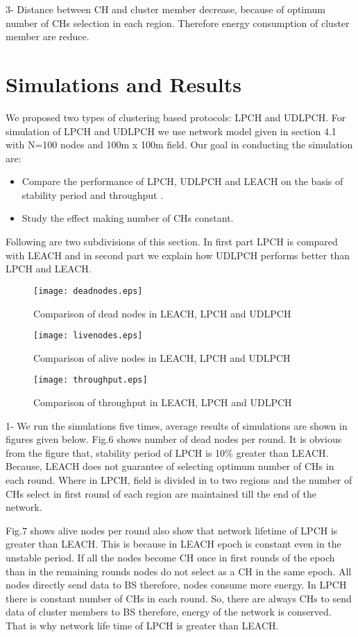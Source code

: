 \documentclass[journal]{IEEEtran}
\begin{document}
{3}- Distance between CH and cluster member decrease, because of optimum number of CHs selection in each region. Therefore energy consumption of cluster member are reduce.

\section{Simulations and Results}
We proposed two types of clustering based protocols: LPCH and UDLPCH. For simulation of LPCH and UDLPCH we use network model given in section 4.1 with N=100 nodes and 100m x 100m field. Our goal in conducting the simulation are:
\begin{itemize}
\item
Compare the performance of LPCH, UDLPCH and LEACH on the basis of stability period and throughput .
\item
Study the effect making number of CHs constant.
\end{itemize}
Following are two subdivisions of this section. In first part LPCH is compared with LEACH and in second part we explain how UDLPCH performs better than LPCH and LEACH.


\begin{figure}[h]
\centering
\texttt{[image: deadnodes.eps]}
\caption{Comparison of dead nodes in LEACH, LPCH and UDLPCH}
\end{figure}
\begin{figure}[h]
\centering
\texttt{[image: livenodes.eps]}
\caption{Comparison of alive nodes in LEACH, LPCH and UDLPCH}
\end{figure}
\begin{figure}[h]
\centering
\texttt{[image: throughput.eps]}
\caption{Comparison of throughput in LEACH, LPCH and UDLPCH}
\end{figure}
{1}- We run the simulations five times, average results of simulations are shown in figures given below. Fig.6 shows number of dead nodes per round. It is obvious from the figure that, stability period of LPCH is 10\% greater than LEACH. Because, LEACH does not guarantee of selecting optimum number of CHs in each round. Where in LPCH, field is divided in to two regions and the number of CHs select in first round of each region are maintained till the end of the network.

Fig.7 shows alive nodes per round also show that network lifetime of LPCH is greater than LEACH. This is because in LEACH epoch is constant even in the unstable period. If all the nodes become CH once in first rounds of the epoch than in the remaining rounds nodes do not select as a CH in the same epoch. All nodes directly send data to BS therefore, nodes consume more energy. In LPCH there is constant number of CHs in each round. So, there are always CHs to send data of cluster members to BS therefore, energy of the network is conserved. That is why network life time of LPCH is greater than LEACH.
\end{document}
